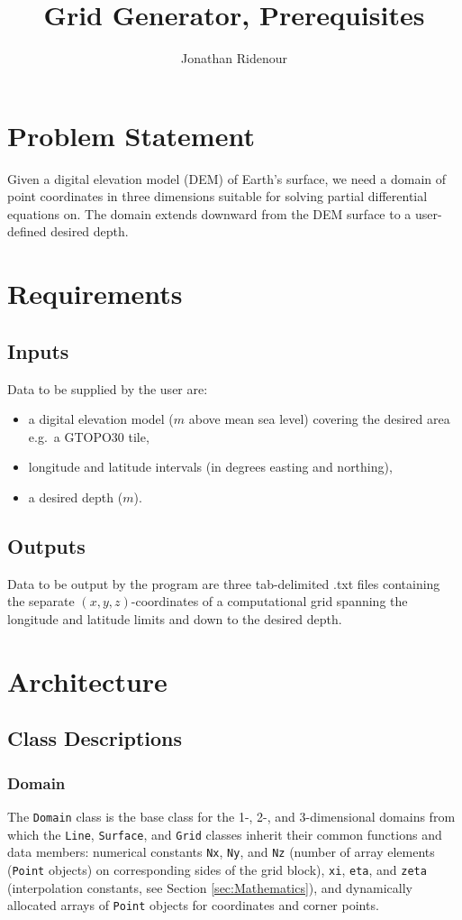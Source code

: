 \documentclass{article}
\title{Grid Generator, Prerequisites\\
}
\author{Jonathan Ridenour}
\renewcommand{\t}[1]{\texttt{#1}}
\begin{document}
\maketitle

\section{Problem Statement}
Given a digital elevation model (DEM) of Earth's surface, we need a domain of point coordinates in three dimensions suitable for solving partial differential equations on. The domain extends downward from the DEM surface to a user-defined desired depth.

\section{Requirements}

\subsection{Inputs}
Data to be supplied by the user are: 
\begin{itemize}
\item a digital elevation model ($m$ above mean sea level) covering the desired area e.g.\ a GTOPO30 tile, 
\item longitude and latitude intervals (in degrees easting and northing),
\item a desired depth ($m$).
\end{itemize}

\subsection{Outputs}
Data to be output by the program are three tab-delimited .txt files containing the separate $(x, y, z)$-coordinates of a computational grid spanning the longitude and latitude limits and down to the desired depth.

\section{Architecture}

\subsection{Class Descriptions}

\subsubsection{Domain}
The \t{Domain} class is the base class for the 1-, 2-, and 3-dimensional domains from which the \t{Line}, \t{Surface}, and \t{Grid} classes inherit their common functions and data members: numerical constants \t{Nx}, \t{Ny}, and \t{Nz} (number of array elements (\t{Point} objects) on corresponding sides of the grid block), \t{xi}, \t{eta}, and \t{zeta} (interpolation constants, see Section \ref{sec:Mathematics}), and dynamically allocated arrays of \t{Point} objects for coordinates and corner points. 
\end{document}
